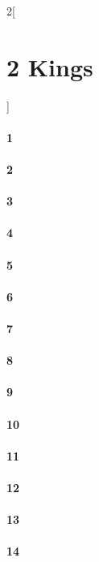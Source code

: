 \documentclass{book}
\begin{document}
\begin{multicols}{2}[\part{2 Kings}]
\subsection*{1}
\subsection*{2}
\subsection*{3}
\subsection*{4}
\subsection*{5}
\subsection*{6}
\subsection*{7}
\subsection*{8}
\subsection*{9}
\subsection*{10}
\subsection*{11}
\subsection*{12}
\subsection*{13}
\subsection*{14}

\end{multicols}
\end{document}
